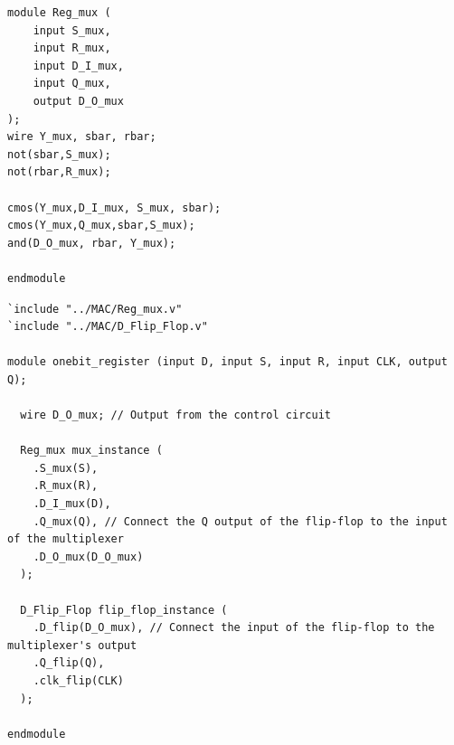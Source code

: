 \begin{lstlisting}[style=verilogStyle, caption=Register control circuit in Verilog, label=verilog_regmux]
module Reg_mux (
    input S_mux,
    input R_mux,
    input D_I_mux,
    input Q_mux,
    output D_O_mux
);			  
wire Y_mux, sbar, rbar;	
not(sbar,S_mux);
not(rbar,R_mux); 

cmos(Y_mux,D_I_mux, S_mux, sbar);
cmos(Y_mux,Q_mux,sbar,S_mux);
and(D_O_mux, rbar, Y_mux);

endmodule
\end{lstlisting}


\begin{lstlisting}[style=verilogStyle, caption=One-bit register in Verilog, label=verilog_onebitregister]
`include "../MAC/Reg_mux.v"
`include "../MAC/D_Flip_Flop.v"

module onebit_register (input D, input S, input R, input CLK, output Q);

  wire D_O_mux; // Output from the control circuit

  Reg_mux mux_instance (
    .S_mux(S),
    .R_mux(R),
    .D_I_mux(D), 
    .Q_mux(Q), // Connect the Q output of the flip-flop to the input of the multiplexer  
    .D_O_mux(D_O_mux)
  );

  D_Flip_Flop flip_flop_instance (
    .D_flip(D_O_mux), // Connect the input of the flip-flop to the multiplexer's output
    .Q_flip(Q),
    .clk_flip(CLK)
  );

endmodule
\end{lstlisting}


